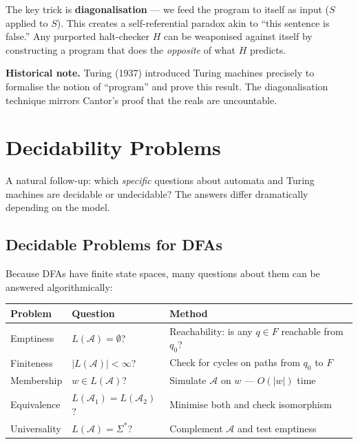 \documentclass[11pt, a4paper]{article}
\theoremstyle{definition}
\theoremstyle{remark}
\newcommand{\dfa}{\mathcal{A}}
\begin{document}
The key trick is \textbf{diagonalisation} --- we feed the program to itself as input ($S$
applied to $S$).  This creates a self-referential paradox akin to ``this sentence is false.''
Any purported halt-checker $H$ can be weaponised against itself by constructing a program
that does the \emph{opposite} of what $H$ predicts.

\begin{notebox}
\textbf{Historical note.}  Turing (1937) introduced Turing machines precisely to formalise
the notion of ``program'' and prove this result.  The diagonalisation technique mirrors
Cantor's proof that the reals are uncountable.
\end{notebox}

\section{Decidability Problems}

A natural follow-up: which \emph{specific} questions about automata and Turing machines are
decidable or undecidable?  The answers differ dramatically depending on the model.

\subsection{Decidable Problems for DFAs}

Because DFAs have finite state spaces, many questions about them can be answered
algorithmically:

\begin{center}
\begin{tabular}{lll}
  \toprule
  Problem      & Question          & Method \\
  \midrule
  Emptiness    & $L(\dfa)=\emptyset$?
               & Reachability: is any $q\in F$ reachable from $q_0$? \\
  Finiteness   & $|L(\dfa)|<\infty$?
               & Check for cycles on paths from $q_0$ to $F$ \\
  Membership   & $w\in L(\dfa)$?
               & Simulate $\dfa$ on $w$ --- $O(|w|)$ time \\
  Equivalence  & $L(\dfa_1)=L(\dfa_2)$?
               & Minimise both and check isomorphism \\
  Universality & $L(\dfa)=\Sigma^*$?
               & Complement $\dfa$ and test emptiness \\
  \bottomrule
\end{tabular}
\end{center}
\end{document}
